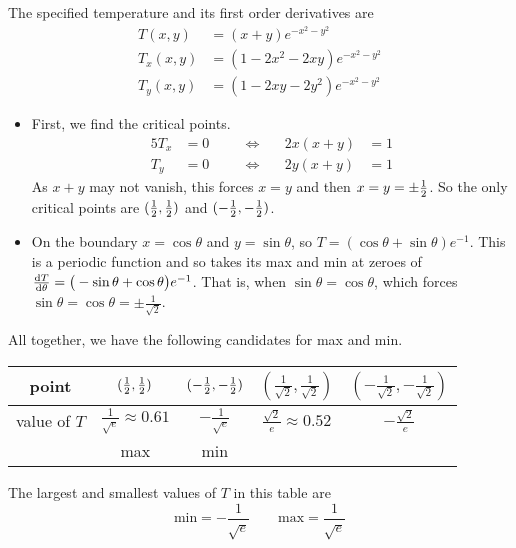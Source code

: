 \begin{solution}
The specified temperature and its first order derivatives are
\begin{align*}
T(x,y)&=(x+y)e^{-x^2-y^2}\\
T_x(x,y)&=(1-2x^2-2xy)e^{-x^2-y^2}\\
T_y(x,y)&=(1-2xy-2y^2)e^{-x^2-y^2}
\end{align*}
\begin{itemize}
\item
First, we find the critical points.
\begin{alignat*}{5}
T_x&=0 & &\quad\iff\quad & 2x(x+y)&=1 \\
T_y&=0 & &\quad\iff\quad & 2y(x+y)&=1 
\end{alignat*}
As $x+y$ may not vanish, this forces $x=y$ and then $x=y=\pm\tfrac{1}{2}$.
So the only critical points are $(\tfrac{1}{2},\tfrac{1}{2})$ and $(-\tfrac{1}{2},-\tfrac{1}{2})$. 
\item
 On the boundary $x=\cos\theta$ and $y=\sin\theta$, 
so $T=(\cos\theta+\sin\theta)e^{-1}$.
This is a periodic function and so takes its max and min at zeroes of
$\diff{T}{\theta}=\big(-\sin\theta+\cos\theta\big)e^{-1}$. That is, 
when $\sin\theta=\cos\theta$,
which forces $\sin\theta=\cos\theta=\pm\frac{1}{\sqrt{2}}$. 
\end{itemize}
All together, we have the following candidates for max and min.
\begin{center}
\renewcommand{\arraystretch}{1.3}
     \begin{tabular}{|c|c|c|c|c|}
     \hline
       point
       &$(\tfrac{1}{2},\tfrac{1}{2})$
       &$(-\tfrac{1}{2},-\tfrac{1}{2})$
       &$(\frac{1}{\sqrt{2}},\frac{1}{\sqrt{2}})$ 
       &$(-\frac{1}{\sqrt{2}},-\frac{1}{\sqrt{2}})$ \\ \hline
       value of $T$
       &$\frac{1}{\sqrt{e}}\approx0.61$
       &$-\frac{1}{\sqrt{e}}$
       &$\frac{\sqrt{2}}{e}\approx0.52$
       &$-\frac{\sqrt{2}}{e}$ \\ \hline
       &max
       &min    
       &  
       &
       \\ \hline
     \end{tabular}
\renewcommand{\arraystretch}{1.0}
\end{center}
The largest and smallest values of $T$ in this table are
\begin{equation*}
\text{min}=-\frac{1}{\sqrt{e}}\qquad
\text{max}=\frac{1}{\sqrt{e}}
\end{equation*}
\end{solution}



